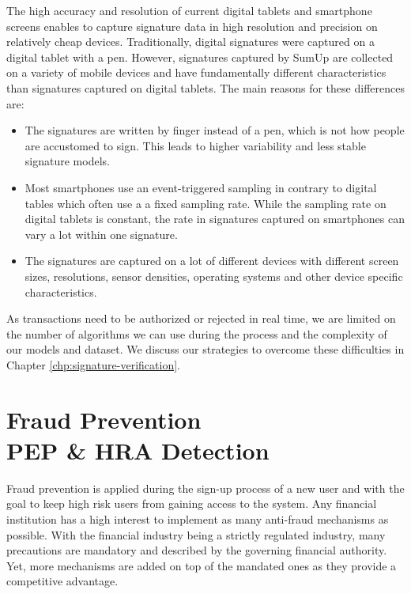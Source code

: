 \documentclass[a4paper, oneside]{csthesis}
\begin{document}
The high accuracy and resolution of current digital tablets and smartphone screens enables to capture signature data in high resolution and precision on relatively cheap devices.
Traditionally, digital signatures were captured on a digital tablet with a pen. However, signatures captured by SumUp are collected on a variety of mobile devices and have fundamentally different characteristics than signatures captured on digital tablets. The main reasons for these differences are:

\begin{itemize}
    \item The signatures are written by finger instead of a pen, which is not how people are accustomed to sign. This leads to higher variability and less stable signature models.
    \item Most smartphones use an event-triggered sampling in contrary to digital tables which often use a a fixed sampling rate. While the sampling rate on digital tablets is constant, the rate in signatures captured on smartphones can vary a lot within one signature.
    \item The signatures are captured on a lot of different devices with different screen sizes, resolutions, sensor densities, operating systems and other device specific characteristics.
\end{itemize}

As transactions need to be authorized or rejected in real time, we are limited on the number of algorithms we can use during the process and the complexity of our models and dataset.
We discuss our strategies to overcome these difficulties in Chapter \ref{chp:signature-verification}.




\chapter{Fraud Prevention \\PEP \& HRA Detection}

Fraud prevention is applied during the sign-up process of a new user and with the goal to keep high risk users from gaining access to the system.
Any financial institution has a high interest to implement as many anti-fraud mechanisms as possible. With the financial industry being a strictly regulated industry, many precautions are mandatory and described by the governing financial authority. Yet, more mechanisms are added on top of the mandated ones as they provide a competitive advantage.
\end{document}

